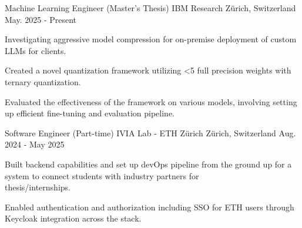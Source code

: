 

\begin{cventries}

  \cventry
    {Machine Learning Engineer (Master's Thesis)} %
    {IBM Research} %
    {Zürich, Switzerland} %
    {May. 2025 - Present} %
    {
      \begin{cvitems} %
        \item {Investigating aggressive model compression for on-premise deployment of custom LLMs for clients.}
        \item {Created a novel quantization framework utilizing <5 full precision weights with ternary quantization.}
        \item {Evaluated the effectiveness of the framework on various models, involving setting up efficient fine-tuning and evaluation pipeline.}
      \end{cvitems}
    }

  \cventry
    {Software Engineer (Part-time)} %
    {IVIA Lab - ETH Zürich} %
    {Zürich, Switzerland} %
    {Aug. 2024 - May 2025} %
    {
      \begin{cvitems} %
        \item {Built backend capabilities and set up devOps pipeline from the ground up for a system to connect students with industry partners for \\
        thesis/internships.}
        \item {Enabled authentication and authorization including SSO for ETH users through Keycloak integration across the stack.}
      \end{cvitems}
    }


\end{cventries}
